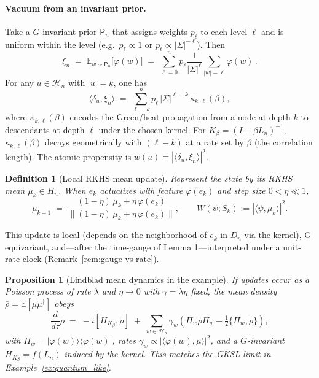 \documentclass[12pt,a4paper]{article}
\newtheorem{definition}{Definition}
\newtheorem{proposition}{Proposition}
\newcommand{\E}{\mathbb{E}}
\begin{document}
\paragraph{Vacuum from an invariant prior.} Take a $G$-invariant prior $\mathsf{P}_n$ that assigns weights $p_\ell$ to each level $\ell$ and is uniform within the level (e.g.\ $p_\ell\propto 1$ or $p_\ell\propto |\Sigma|^{-\ell}$). Then
\begin{equation*}
\xi_n \;=\; \E_{w\sim \mathsf{P}_n}\big[\varphi(w)\big]
\;=\; \sum_{\ell=0}^{n} p_\ell \frac{1}{|\Sigma|^\ell} \sum_{|w|=\ell}\!\varphi(w)\,.
\end{equation*}
For any $u\in\mathcal{H}_n$ with $|u|=k$, one has
\begin{equation*}
\langle \delta_u, \xi_n\rangle \;=\; \sum_{\ell=k}^{n} p_\ell\, |\Sigma|^{\ell-k}\,\kappa_{k,\ell}(\beta),
\end{equation*}
where $\kappa_{k,\ell}(\beta)$ encodes the Green/heat propagation from a node at depth $k$ to descendants at depth $\ell$ under the chosen kernel. For $K_\beta=(I+\beta L_n)^{-1}$, $\kappa_{k,\ell}(\beta)$ decays geometrically with $(\ell{-}k)$ at a rate set by $\beta$ (the correlation length). The atomic propensity is $w(u)=|\langle \delta_u,\xi_n\rangle|^2$.

\begin{definition}[Local RKHS mean update]\label{def:local-rkhs-update}
Represent the state by its RKHS mean $\mu_k\in H_n$. When $e_k$ actualizes with feature $\varphi(e_k)$ and step size $0<\eta\ll 1$,
\begin{equation*}
\mu_{k+1} \;=\; \frac{(1-\eta)\,\mu_k + \eta\,\varphi(e_k)}{\|(1-\eta)\,\mu_k + \eta\,\varphi(e_k)\|},\qquad
W(\psi;S_k):=|\langle \psi,\mu_k\rangle|^2.
\end{equation*}
\end{definition}
This update is local (depends on the neighborhood of \(e_k\) in \(D_n\) via the kernel), G-equivariant,
and—after the time-gauge of Lemma 1—interpreted under a unit-rate clock (Remark~\ref{rem:gauge-vs-rate}).

\begin{proposition}[Lindblad mean dynamics in the example]\label{prop:gksl_prefix}
If updates occur as a Poisson process of rate $\lambda$ and $\eta\to 0$ with $\gamma=\lambda\eta$ fixed, the mean density $\bar\rho=\E[\mu\mu^\dagger]$ obeys
\begin{equation*}
\frac{d}{d\tau}\bar\rho \;=\; -i[H_{K_\beta},\bar\rho] \;+\; \sum_{w\in\mathcal{H}_n}\gamma_w\!\left(\Pi_w \bar\rho \Pi_w - \tfrac{1}{2}\{\Pi_w,\bar\rho\}\right),
\end{equation*}
with $\Pi_w=|\varphi(w)\rangle\langle \varphi(w)|$, rates $\gamma_w\propto |\langle \varphi(w),\mu\rangle|^2$, and a $G$-invariant $H_{K_\beta}=f(L_n)$ induced by the kernel. This matches the GKSL limit in Example~\ref{ex:quantum_like}.
\end{proposition}
\end{document}
